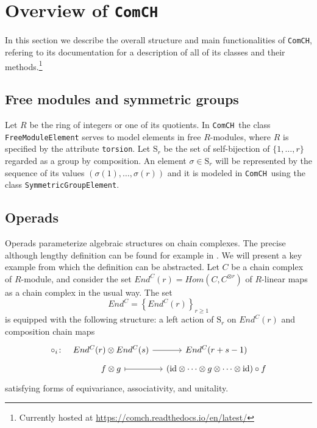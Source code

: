\documentclass{amsart}
\renewcommand{\S}{\mathrm S}
\newcommand{\comch}{\texttt{ComCH}}
\newcommand{\id}{\mathrm{id}}
\begin{document}
\section{Overview of \comch} \label{s: overview}
In this section we describe the overall structure and main functionalities of \comch, refering to its documentation for a description of all of its classes and their methods.\footnote{Currently hosted at \url{https://comch.readthedocs.io/en/latest/}}

\subsection{Free modules and symmetric groups}

Let $R$ be the ring of integers or one of its quotients. In \comch\, the class \texttt{FreeModuleElement} serves to model elements in free $R$-modules, where $R$ is specified by the attribute \texttt{torsion}. Let $\S_r$ be the set of self-bijection of $\{1, \dots, r\}$ regarded as a group by composition. An element $\sigma \in \S_r$ will be represented by the sequence of its values $(\sigma(1), \dots, \sigma(r))$ and it is modeled in \comch\, using the class \texttt{SymmetricGroupElement}.

\subsection{Operads}

Operads parameterize algebraic structures on chain complexes. The precise although lengthy definition can be found for example in \cite{Markl08}. We will present a key example from which the definition can be abstracted. Let $C$ be a chain complex of $R$-module, and consider the set $End^C(r) = Hom(C, C^{\otimes r})$ of $R$-linear maps as a chain complex in the usual way. The set 
\begin{equation*}
End^C = \left\{End^C(r)\right\}_{r \geq 1}
\end{equation*}
is equipped with the following structure: a left action of $\S_r$ on $End^C(r)$ and composition chain maps
\begin{equation*}
\begin{tikzcd}[column sep=small, row sep=tiny]
\circ_i \colon &[-10pt] End^C(r) \otimes End^C(s) \arrow[r] & End^C(r+s-1) \\
& f \otimes g \arrow[r, |->] & (\id \otimes \cdots \otimes g \otimes \cdots \otimes \id) \circ f 
\end{tikzcd}
\end{equation*}
satisfying forms of equivariance, associativity, and unitality.
\end{document}
